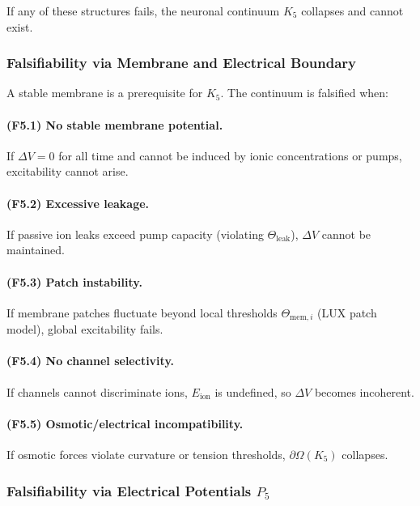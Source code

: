 If any of these structures fails, the neuronal continuum $K_5$
collapses and cannot exist.



\subsubsection{Falsifiability via Membrane and Electrical Boundary}

A stable membrane is a prerequisite for $K_5$.
The continuum is falsified when:

\paragraph{(F5.1) No stable membrane potential.}
If $\Delta V = 0$ for all time and cannot be induced by ionic
concentrations or pumps, excitability cannot arise.

\paragraph{(F5.2) Excessive leakage.}
If passive ion leaks exceed pump capacity (violating
$\Theta_{\mathrm{leak}}$), $\Delta V$ cannot be maintained.

\paragraph{(F5.3) Patch instability.}
If membrane patches fluctuate beyond local thresholds
$\Theta_{\mathrm{mem},i}$ (LUX patch model), global excitability fails.

\paragraph{(F5.4) No channel selectivity.}
If channels cannot discriminate ions, $E_{\mathrm{ion}}$ is undefined,
so $\Delta V$ becomes incoherent.

\paragraph{(F5.5) Osmotic/electrical incompatibility.}
If osmotic forces violate curvature or tension thresholds,
$\partial\Omega(K_5)$ collapses.



\subsubsection{Falsifiability via Electrical Potentials \texorpdfstring{$P_5$}{P_5}}

